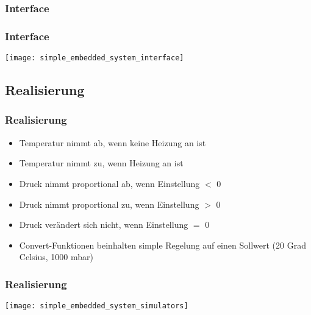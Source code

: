 \documentclass[ngerman]{presentation}
\begin{document}
\subsubsection{Interface}
\label{sec:interface}


\begin{frame}[c,label=interface]
    \frametitle{Interface}
    \hspace*{-0.9cm}\texttt{[image: simple\_embedded\_system\_interface]}
\end{frame}

\subsection{Realisierung}
\label{sec:realisierung}

\begin{frame}[c,label=realisierung]
    \frametitle{Realisierung}

    \begin{itemize}
        \item Temperatur nimmt ab, wenn keine Heizung an ist
        \item Temperatur nimmt zu, wenn Heizung an ist
            \pause
        \item Druck nimmt proportional ab, wenn Einstellung $<$ 0
        \item Druck nimmt proportional zu, wenn Einstellung $>$ 0
        \item Druck verändert sich nicht, wenn Einstellung $=$ 0
    \end{itemize}

    \pause

    \begin{itemize}
        \item Convert-Funktionen beinhalten simple Regelung auf einen Sollwert
            (20 Grad Celsius, 1000 mbar)
    \end{itemize}
\end{frame}

\begin{frame}[c,label=realisierung]
    \frametitle{Realisierung}

    \hspace*{-0.9cm}\texttt{[image: simple\_embedded\_system\_simulators]}
\end{frame}
\end{document}
